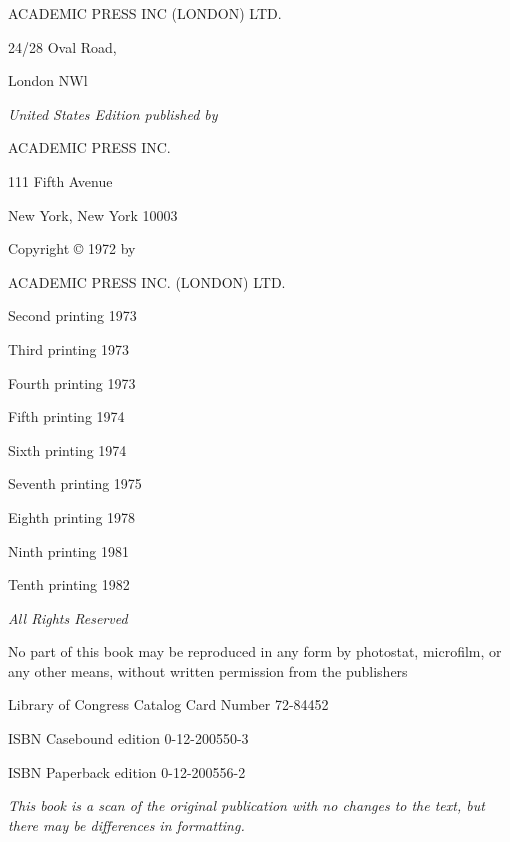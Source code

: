 \begin{center}
	\small
	ACADEMIC PRESS INC (LONDON) LTD.
	
	24/28 Oval Road,
	
	London NWl
	\bigskip
	
	\textit{United States Edition published by}
	
	ACADEMIC PRESS INC.
	
	111 Fifth Avenue
	
	New York, New York 10003
	\vfill
	
	Copyright © 1972 by
	
	ACADEMIC PRESS INC. (LONDON) LTD.
	\vfill
	
	Second printing 1973
	
	Third printing 1973
	
	Fourth printing 1973
	
	Fifth printing 1974
	
	Sixth printing 1974
	
	Seventh printing 1975
	
	Eighth printing 1978
	
	Ninth printing 1981
	
	Tenth printing 1982
	\vfill
	
	\textit{All Rights Reserved}
		
	No part of this book may be reproduced in any form by photostat, microfilm, or any other means, without written permission from the publishers
	\vfill
	
	Library of Congress Catalog Card Number 72-84452
	
	ISBN Casebound edition 0-12-200550-3
	
	ISBN Paperback edition 0-12-200556-2
	\bigskip
	
	\textit{This book is a scan of the original publication with no changes to the text, but there may be differences in formatting.}

\end{center}